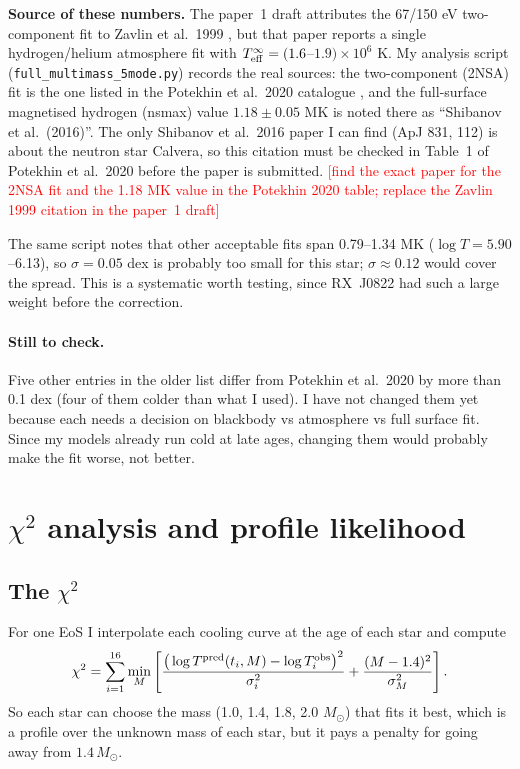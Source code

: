 \documentclass[11pt,a4paper]{article}
\newcommand{\fillin}[1]{\textcolor{red}{[#1]}}
\newcommand{\Msun}{M_\odot}
\begin{document}
\noindent\textbf{Source of these numbers.} The paper~1 draft attributes the 67/150 eV two-component fit to Zavlin et al.\ 1999 \cite{Zavlin1999}, but that paper reports a single hydrogen/helium atmosphere fit with $T^\infty_{\rm eff}=(1.6$--$1.9)\times10^6$ K. My analysis script (\texttt{full\_multimass\_5mode.py}) records the real sources: the two-component (2NSA) fit is the one listed in the Potekhin et al.\ 2020 catalogue \cite{Potekhin2020}, and the full-surface magnetised hydrogen (nsmax) value $1.18\pm0.05$ MK is noted there as ``Shibanov et al.\ (2016)''. The only Shibanov et al.\ 2016 paper I can find (ApJ 831, 112) is about the neutron star Calvera, so this citation must be checked in Table~1 of Potekhin et al.\ 2020 before the paper is submitted. \fillin{find the exact paper for the 2NSA fit and the 1.18 MK value in the Potekhin 2020 table; replace the Zavlin 1999 citation in the paper~1 draft}

The same script notes that other acceptable fits span 0.79--1.34 MK ($\log T=5.90$--6.13), so $\sigma=0.05$ dex is probably too small for this star; $\sigma\approx0.12$ would cover the spread. This is a systematic worth testing, since RX~J0822 had such a large weight before the correction.

\paragraph{Still to check.} Five other entries in the older list differ from Potekhin et al.\ 2020 by more than 0.1 dex (four of them colder than what I used). I have not changed them yet because each needs a decision on blackbody vs atmosphere vs full surface fit. Since my models already run cold at late ages, changing them would probably make the fit worse, not better.

\section{$\chi^2$ analysis and profile likelihood}\label{sec:stats}
\subsection{The $\chi^2$}
For one EoS I interpolate each cooling curve at the age of each star and compute
\begin{equation}
\chi^2 = \sum_{i=1}^{16}\min_{M}\left[\frac{\big(\log T^{\rm pred}(t_i,M)-\log T^{\rm obs}_i\big)^2}{\sigma_i^2} + \frac{(M-1.4)^2}{\sigma_M^2}\right].
\end{equation}
So each star can choose the mass (1.0, 1.4, 1.8, 2.0 $\Msun$) that fits it best, which is a profile over the unknown mass of each star, but it pays a penalty for going away from $1.4\,\Msun$.
\end{document}
